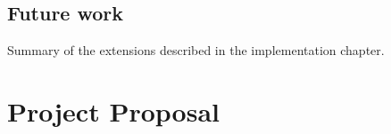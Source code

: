 \documentclass[12pt,a4paper,oneside,openright]{report}
\begin{document}
\section{Future work}
\label{sec:conc:future-work}

Summary of the extensions described in the implementation chapter.



\appendix

\chapter{Project Proposal}
\label{cha:project-proposal}
\end{document}
